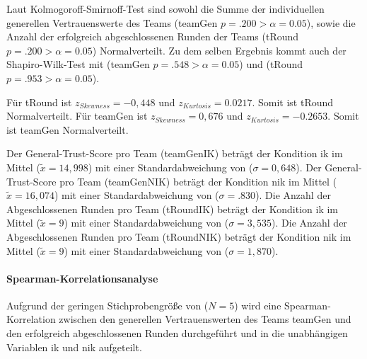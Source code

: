 \documentclass[a4paper,11pt]{article}%
\renewcommand{\\}{\vspace*{0.5\baselineskip} \newline}
\begin{document}
Laut Kolmogoroff-Smirnoff-Test sind sowohl die Summe der individuellen generellen Vertrauenswerte des Teams (\ac{teamGen} $p = .200 > \alpha = 0.05$), sowie die Anzahl der erfolgreich abgeschlossenen Runden der Teams (\ac{tRound} $p = .200 > \alpha = 0.05$) Normalverteilt.
Zu dem selben Ergebnis kommt auch der Shapiro-Wilk-Test mit (\ac{teamGen} $p = .548 > \alpha = 0.05$) und (\ac{tRound} $p = .953 > \alpha = 0.05$).

Für \ac{tRound} ist $ z_{Skewness} = -0,448 $ und $z_{Kurtosis} = 0.0217$. Somit ist tRound Normalverteilt.
Für \ac{teamGen} ist $ z_{Skewness} = 0,676 $ und $z_{Kurtosis} = -0.2653$. Somit ist teamGen Normalverteilt.

Der General-Trust-Score pro Team (\ac{teamGenIK}) beträgt der Kondition \ac{ik} im Mittel ($\tilde x = 14,998$) mit einer Standardabweichung von ($\sigma = 0,648$).\newline 
Der General-Trust-Score pro Team (\ac{teamGenNIK}) beträgt der Kondition \ac{nik} im Mittel ($\tilde x = 16,074$) mit einer Standardabweichung von ($\sigma = .830$). \newline 
Die Anzahl der Abgeschlossenen Runden pro Team (\ac{tRoundIK}) beträgt der Kondition \ac{ik} im Mittel ($\tilde x = 9$) mit einer Standardabweichung von ($\sigma = 3,535$).\newline 
 Die Anzahl der Abgeschlossenen Runden pro Team (\ac{tRoundNIK}) beträgt der Kondition \ac{nik} im Mittel ($\tilde x = 9$) mit einer Standardabweichung von ($\sigma = 1,870$). 

		\paragraph{Spearman-Korrelationsanalyse}
Aufgrund der geringen Stichprobengröße von ($N=5$) wird eine Spearman-Korrelation zwischen den generellen Vertrauenswerten des Teams \ac{teamGen} und den erfolgreich abgeschlossenen Runden durchgeführt und in die unabhängigen Variablen \ac{ik} und \ac{nik} aufgeteilt.
%
\end{document}

